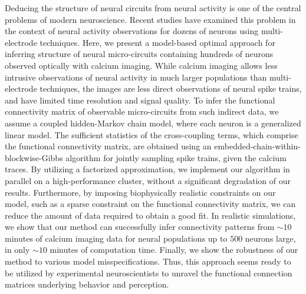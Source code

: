 Deducing the structure of neural circuits from neural activity is one of the central problems of modern neuroscience. Recent studies have examined this problem in the context of neural activity observations for dozens of neurons using multi-electrode techniques. Here, we present a model-based optimal approach for inferring structure of neural micro-circuits containing hundreds of neurons observed optically with calcium imaging. While calcium imaging allows less intrusive observations of neural activity in much larger populations than multi-electrode techniques, the images are less direct observations of neural spike trains, and have limited time resolution and signal quality.  To infer the functional connectivity matrix of observable micro-circuits from such indirect data, we assume a coupled hidden-Markov chain model, where each neuron is a generalized linear model.  The sufficient statistics of the cross-coupling terms, which comprise the functional connectivity matrix, are obtained using an embedded-chain-within-blockwise-Gibbs algorithm for jointly sampling spike trains, given the calcium traces. By utilizing a factorized approximation, we implement our algorithm in parallel on a high-performance cluster, without a significant degradation of our results.  Furthermore, by imposing biophysically realistic constraints on our model, such as a sparse constraint on the functional connectivity matrix, we can reduce the amount of data required to obtain a good fit.  In realistic simulations, we show that our method can successfully infer connectivity patterns from $\sim 10$ minutes of calcium imaging data for neural populations up to $500$ neurons large, in only $\sim 10$ minutes of computation time.  Finally, we show the robustness of our method to various model misspecifications.  Thus, this approach seems ready to be utilized by experimental neuroscientists to unravel the functional connection matrices underlying behavior and perception.
